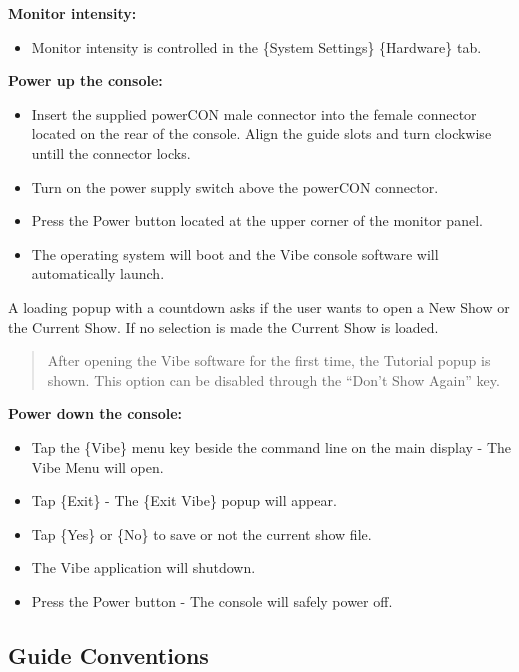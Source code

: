 \documentclass[
]{article}
\providecommand{\tightlist}{%
  \setlength{\itemsep}{0pt}\setlength{\parskip}{0pt}}
\begin{document}
\textbf{Monitor intensity:}

\begin{itemize}
\tightlist
\item
  Monitor intensity is controlled in the \{System Settings\} \{Hardware\} tab.
\end{itemize}

\textbf{Power up the console:}

\begin{itemize}
\tightlist
\item
  Insert the supplied powerCON male connector into the female connector located on the rear of the console. Align the guide slots and turn clockwise untill the connector locks.
\item
  Turn on the power supply switch above the powerCON connector.
\item
  Press the Power button located at the upper corner of the monitor panel.
\item
  The operating system will boot and the Vibe console software will automatically launch.
\end{itemize}

A loading popup with a countdown asks if the user wants to open a New Show or the Current Show.
If no selection is made the Current Show is loaded.

\begin{quote}
After opening the Vibe software for the first time, the Tutorial popup is shown. This option can be disabled through the ``Don't Show Again'' key.
\end{quote}

\textbf{Power down the console:}

\begin{itemize}
\tightlist
\item
  Tap the \{Vibe\} menu key beside the command line on the main display - The Vibe Menu will open.
\item
  Tap \{Exit\} - The \{Exit Vibe\} popup will appear.
\item
  Tap \{Yes\} or \{No\} to save or not the current show file.
\item
  The Vibe application will shutdown.
\item
  Press the Power button - The console will safely power off.
\end{itemize}

\hypertarget{Guide-Conventions-1.2}{%
\subsection{Guide Conventions}\label{Guide-Conventions-1.2}}
\end{document}
